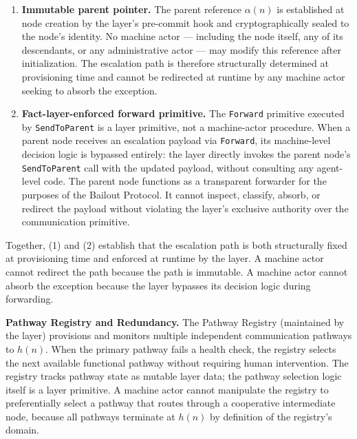 \begin{enumerate}
\item \textbf{Immutable parent pointer.} The parent reference $\alpha(n)$ is established at node creation by the \fact{} layer's pre-commit hook and cryptographically sealed to the node's identity. No machine actor — including the node itself, any of its descendants, or any administrative actor — may modify this reference after initialization. The escalation path is therefore structurally determined at provisioning time and cannot be redirected at runtime by any machine actor seeking to absorb the exception.

\item \textbf{Fact-layer-enforced forward primitive.} The \texttt{Forward} primitive executed by \texttt{SendToParent} is a \fact{} layer primitive, not a machine-actor procedure. When a parent node receives an escalation payload via \texttt{Forward}, its machine-level decision logic is bypassed entirely: the \fact{} layer directly invokes the parent node's \texttt{SendToParent} call with the updated payload, without consulting any agent-level code. The parent node functions as a transparent forwarder for the purposes of the Bailout Protocol. It cannot inspect, classify, absorb, or redirect the payload without violating the \fact{} layer's exclusive authority over the communication primitive.
\end{enumerate}

Together, (1) and (2) establish that the escalation path is both structurally fixed at provisioning time and enforced at runtime by the \fact{} layer. A machine actor cannot redirect the path because the path is immutable. A machine actor cannot absorb the exception because the \fact{} layer bypasses its decision logic during forwarding.

\medskip
\noindent\textbf{Pathway Registry and Redundancy.} The Pathway Registry (maintained by the \fact{} layer) provisions and monitors multiple independent communication pathways to $h(n)$. When the primary pathway fails a health check, the registry selects the next available functional pathway without requiring human intervention. The registry tracks pathway state as mutable \fact{} layer data; the pathway selection logic itself is a \fact{} layer primitive. A machine actor cannot manipulate the registry to preferentially select a pathway that routes through a cooperative intermediate node, because all pathways terminate at $h(n)$ by definition of the registry's domain.

